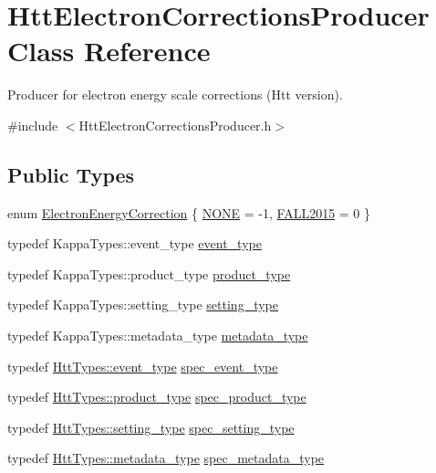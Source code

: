 \hypertarget{classHttElectronCorrectionsProducer}{
\section{HttElectronCorrectionsProducer Class Reference}
\label{classHttElectronCorrectionsProducer}
}


Producer for electron energy scale corrections (Htt version).  


{\ttfamily \#include $<$HttElectronCorrectionsProducer.h$>$}\subsection*{Public Types}
\begin{DoxyCompactItemize}
\item 
enum \hyperlink{classHttElectronCorrectionsProducer_a4a9df688e889b0c00043b901eecaac4c}{ElectronEnergyCorrection} \{ \hyperlink{classHttElectronCorrectionsProducer_a4a9df688e889b0c00043b901eecaac4cad6a08c4c96f309eeca36c533657962b9}{NONE} =  -\/1, 
\hyperlink{classHttElectronCorrectionsProducer_a4a9df688e889b0c00043b901eecaac4ca87fb65884138c9c12222dffa316c7c64}{FALL2015} =  0
 \}
\item 
typedef KappaTypes::event\_\-type \hyperlink{classHttElectronCorrectionsProducer_a7972baeb26d5c7003099092fe30db215}{event\_\-type}
\item 
typedef KappaTypes::product\_\-type \hyperlink{classHttElectronCorrectionsProducer_a3e393b3f94ee4c60d6bbb9bc5fb33416}{product\_\-type}
\item 
typedef KappaTypes::setting\_\-type \hyperlink{classHttElectronCorrectionsProducer_a7e0458045a229bf4cdb7dbdc488078be}{setting\_\-type}
\item 
typedef KappaTypes::metadata\_\-type \hyperlink{classHttElectronCorrectionsProducer_a956e67f1c2b74330fe6da6e5dad3eb50}{metadata\_\-type}
\item 
typedef \hyperlink{classHttEvent}{HttTypes::event\_\-type} \hyperlink{classHttElectronCorrectionsProducer_aec239474ed932e121abaed5120be13f5}{spec\_\-event\_\-type}
\item 
typedef \hyperlink{classHttProduct}{HttTypes::product\_\-type} \hyperlink{classHttElectronCorrectionsProducer_a9824b78ffae5c1f3e425dcac5ce9b2ee}{spec\_\-product\_\-type}
\item 
typedef \hyperlink{classHttSettings}{HttTypes::setting\_\-type} \hyperlink{classHttElectronCorrectionsProducer_aa3b043e17998776aaa656403db7427c4}{spec\_\-setting\_\-type}
\item 
typedef \hyperlink{classHttMetadata}{HttTypes::metadata\_\-type} \hyperlink{classHttElectronCorrectionsProducer_a28d582443a6aa64237a73ad5d993b34f}{spec\_\-metadata\_\-type}
\end{DoxyCompactItemize}
